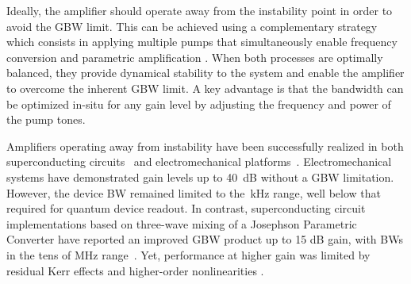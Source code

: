 \documentclass[%
reprint,
floatfix,
superscriptaddress,
amsmath,amssymb,
aps,
pra,
]{revtex4-2}
\begin{document}
Ideally, the amplifier should operate away from the instability point in order to avoid the GBW limit. This can be achieved using a complementary strategy which consists in applying multiple pumps that simultaneously enable frequency conversion and parametric amplification \cite{Metelmann2014Apr,Nunnenkamp2014Jul,Metelmann2015Jun,Metelmann2022Bog,Ruddy2024Aug}. When both processes are optimally balanced, they provide dynamical stability to the system and enable the amplifier to overcome the inherent GBW limit. A key advantage is that the bandwidth can be optimized in-situ for any gain level by adjusting the frequency and power of the pump tones. 

Amplifiers operating away from instability have been successfully realized in both superconducting circuits~\cite{Chien2020Apr,Jiang2023Apr,Dassonneville2021May} and electromechanical platforms~\cite{Ockeloen-Korppi2016Oct,Toth2017Aug}. Electromechanical systems have demonstrated gain levels up to 40~dB without a GBW limitation. However, the device BW remained limited to the~kHz range, well below that required for quantum device readout. In contrast, superconducting circuit implementations based on three-wave mixing of a Josephson Parametric Converter have reported an improved GBW product up to 15 dB gain, with BWs in the tens of MHz range~\cite{Chien2020Apr}. Yet, performance at higher gain was limited by residual Kerr effects and higher-order nonlinearities \cite{Chien2020Apr,Jiang2023Apr,Dassonneville2021May}.
\end{document}
